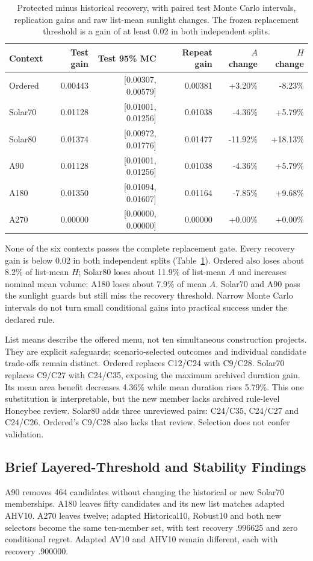 \documentclass{llncs}
\begin{document}
\begin{table}[tbp]\centering\small\caption{Protected minus historical recovery, with paired test Monte Carlo intervals, replication gains and raw list-mean sunlight changes. The frozen replacement threshold is a gain of at least 0.02 in both independent splits.}\label{tab:gates}
\begin{tabular}{lrrrrr}\toprule
Context & Test gain & Test 95\% MC & Repeat gain & $A$ change & $H$ change\\\midrule
Ordered & 0.00443 & [0.00307, 0.00579] & 0.00381 & +3.20\% & -8.23\%\\
Solar70 & 0.01128 & [0.01001, 0.01256] & 0.01038 & -4.36\% & +5.79\%\\
Solar80 & 0.01374 & [0.00972, 0.01776] & 0.01477 & -11.92\% & +18.13\%\\
A90 & 0.01128 & [0.01001, 0.01256] & 0.01038 & -4.36\% & +5.79\%\\
A180 & 0.01350 & [0.01094, 0.01607] & 0.01164 & -7.85\% & +9.68\%\\
A270 & 0.00000 & [0.00000, 0.00000] & 0.00000 & +0.00\% & +0.00\%\\
\bottomrule\end{tabular}\end{table}

None of the six contexts passes the complete replacement gate. Every recovery gain is below 0.02 in both independent splits (Table~\ref{tab:gates}). Ordered also loses about 8.2\% of list-mean $H$; Solar80 loses about 11.9\% of list-mean $A$ and increases nominal mean volume; A180 loses about 7.9\% of mean $A$. Solar70 and A90 pass the sunlight guards but still miss the recovery threshold. Narrow Monte Carlo intervals do not turn small conditional gains into practical success under the declared rule.

List means describe the offered menu, not ten simultaneous construction projects. They are explicit safeguards; scenario-selected outcomes and individual candidate trade-offs remain distinct. Ordered replaces C12/C24 with C9/C28. Solar70 replaces C9/C27 with C24/C35, exposing the maximum archived duration gain. Its mean area benefit decreases 4.36\% while mean duration rises 5.79\%. This one substitution is interpretable, but the new member lacks archived rule-level Honeybee review. Solar80 adds three unreviewed pairs: C24/C35, C24/C27 and C24/C26. Ordered's C9/C28 also lacks that review. Selection does not confer validation.

\subsection{Brief Layered-Threshold and Stability Findings}
A90 removes 464 candidates without changing the historical or new Solar70 memberships. A180 leaves fifty candidates and its new list matches adapted AHV10. A270 leaves twelve; adapted Historical10, Robust10 and both new selectors become the same ten-member set, with test recovery .996625 and zero conditional regret. Adapted AV10 and AHV10 remain different, each with recovery .900000.
\end{document}

